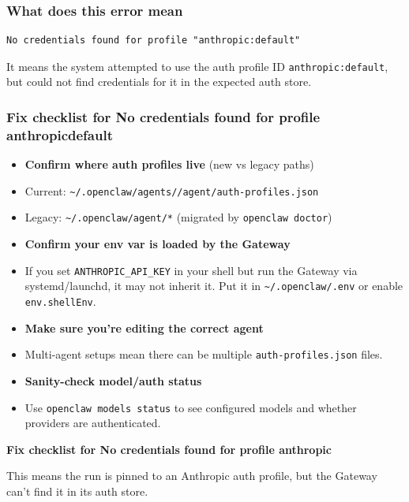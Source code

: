 \subsubsection{What does this error mean}


\begin{lstlisting}
No credentials found for profile "anthropic:default"
\end{lstlisting}


It means the system attempted to use the auth profile ID \texttt{anthropic:default}, but could not find credentials for it in the expected auth store.

\subsubsection{Fix checklist for No credentials found for profile anthropicdefault}


\begin{itemize}
  \item \textbf{Confirm where auth profiles live} (new vs legacy paths)
  \item Current: \texttt{\textasciitilde{}/.openclaw/agents//agent/auth-profiles.json}
  \item Legacy: \texttt{\textasciitilde{}/.openclaw/agent/*} (migrated by \texttt{openclaw doctor})
  \item \textbf{Confirm your env var is loaded by the Gateway}
  \item If you set \texttt{ANTHROPIC\_API\_KEY} in your shell but run the Gateway via systemd/launchd, it may not inherit it. Put it in \texttt{\textasciitilde{}/.openclaw/.env} or enable \texttt{env.shellEnv}.
  \item \textbf{Make sure you're editing the correct agent}
  \item Multi-agent setups mean there can be multiple \texttt{auth-profiles.json} files.
  \item \textbf{Sanity-check model/auth status}
  \item Use \texttt{openclaw models status} to see configured models and whether providers are authenticated.
\end{itemize}


\textbf{Fix checklist for No credentials found for profile anthropic}

This means the run is pinned to an Anthropic auth profile, but the Gateway
can't find it in its auth store.

